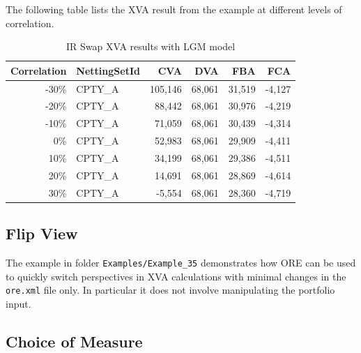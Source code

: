 \documentclass[12pt, a4paper]{article}
\begin{document}
{The following table lists the XVA result from the example at different levels of correlation.

\begin{table}[hbt]
\scriptsize
\begin{center}
\begin{tabular}{|r|l|r|r|r|r|}
\hline
Correlation & NettingSetId & CVA & DVA & FBA & FCA \\
\hline
 -30\%  &  CPTY\_A  & 105,146  &  68,061  &  31,519  &  -4,127 \\
 -20\%  &  CPTY\_A  &  88,442  &  68,061  &  30,976  &  -4,219 \\
 -10\%  &  CPTY\_A  &  71,059  &  68,061  &  30,439  &  -4,314 \\
   0\%  &  CPTY\_A  &  52,983  &  68,061  &  29,909  &  -4,411 \\
  10\%  &  CPTY\_A  &  34,199  &  68,061  &  29,386  &  -4,511 \\
  20\%  &  CPTY\_A  &  14,691  &  68,061  &  28,869  &  -4,614 \\
  30\%  &  CPTY\_A  &  -5,554  &  68,061  &  28,360  &  -4,719 \\
\hline
\end{tabular}
\caption{IR Swap XVA results with LGM model}
\end{center}
\end{table}

\subsection{Flip View}%
\label{example:35}

The example in folder {\tt Examples/Example\_35} demonstrates how ORE can be used to quickly switch perspectives in XVA calculations with minimal changes in the {\tt ore.xml} file only. In particular it does not involve manipulating the portfolio input.

\subsection{Choice of Measure}%
\label{example:36}

}
\end{document}
